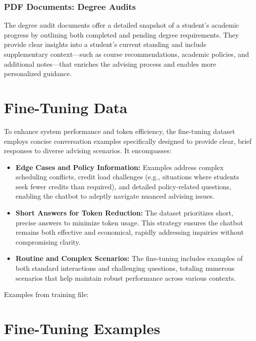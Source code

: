 \documentclass[12pt,oneside,openany]{report}
\begin{document}
\subsubsection{PDF Documents: Degree Audits}
The degree audit documents offer a detailed snapshot of a student’s academic progress by outlining both completed and pending degree requirements. They provide clear insights into a student’s current standing and include supplementary context—such as course recommendations, academic policies, and additional notes—that enriches the advising process and enables more personalized guidance.

\section{Fine-Tuning Data}
To enhance system performance and token efficiency, the fine-tuning dataset employs concise conversation examples specifically designed to provide clear, brief responses to diverse advising scenarios. It encompasses:

\begin{itemize}
\item \textbf{Edge Cases and Policy Information:} Examples address complex scheduling conflicts, credit load challenges (e.g., situations where students seek fewer credits than required), and detailed policy-related questions, enabling the chatbot to adeptly navigate nuanced advising issues.
\item \textbf{Short Answers for Token Reduction:} The dataset prioritizes short, precise answers to minimize token usage. This strategy ensures the chatbot remains both effective and economical, rapidly addressing inquiries without compromising clarity.
\item \textbf{Routine and Complex Scenarios:} The fine-tuning includes examples of both standard interactions and challenging questions, totaling numerous scenarios that help maintain robust performance across various contexts.
\end{itemize}


Examples from training file:

\section{Fine-Tuning Examples}
\end{document}
